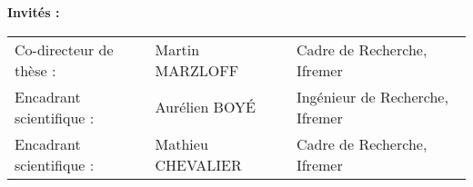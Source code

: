 {\vspace{\baselineskip}
{\normalTwelve \textbf{Invit\'{e}s :}}\\ \newline
\footnotesizeTwelve
\begin{tabular}{@{}lll}
Co-directeur de thèse :  & Martin MARZLOFF & Cadre de Recherche, Ifremer \\
Encadrant scientifique : & Aurélien BOY\'{E} & Ingénieur de Recherche, Ifremer \\
Encadrant scientifique : & Mathieu CHEVALIER & Cadre de Recherche, Ifremer \\

\end{tabular}
}


\maketitle
